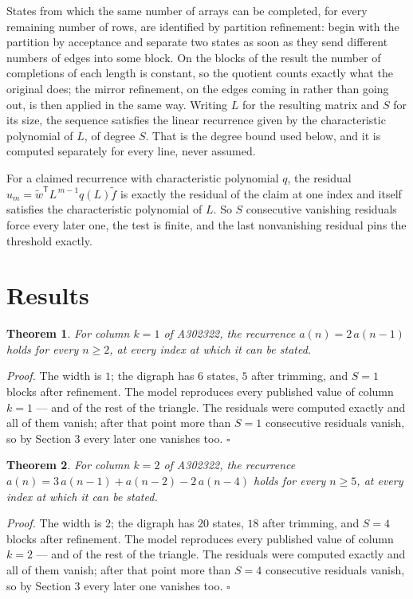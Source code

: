 \documentclass[11pt]{article}
\newtheorem{theorem}{Theorem}
\theoremstyle{definition}
\begin{document}
States from which the same number of arrays can be completed, for every remaining number of rows, are identified by partition refinement: begin with the partition by acceptance and separate two states as soon as they send different numbers of edges into some block. On the blocks of the result the number of completions of each length is constant, so the quotient counts exactly what the original does; the mirror refinement, on the edges coming in rather than going out, is then applied in the same way. Writing $L$ for the resulting matrix and $S$ for its size, the sequence satisfies the linear recurrence given by the characteristic polynomial of $L$, of degree $S$. That is the degree bound used below, and it is computed separately for every line, never assumed.

For a claimed recurrence with characteristic polynomial $q$, the residual $u_m = \tilde w^{\mathsf T}L^{\,m-1}q(L)\tilde f$ is exactly the residual of the claim at one index and itself satisfies the characteristic polynomial of $L$. So $S$ consecutive vanishing residuals force every later one, the test is finite, and the last nonvanishing residual pins the threshold exactly.

\section{Results}

\begin{theorem} For column $k = 1$ of A302322, the recurrence $a(n) = 2\,a(n-1)$ holds for every $n \ge 2$, at every index at which it can be stated.\end{theorem}

{\itshape Proof.} The width is $1$; the digraph has $6$ states, $5$ after trimming, and $S = 1$ blocks after refinement. The model reproduces every published value of column $k = 1$ --- and of the rest of the triangle. The residuals were computed exactly and all of them vanish; after that point more than $S = 1$ consecutive residuals vanish, so by Section 3 every later one vanishes too. $\square$

\begin{theorem} For column $k = 2$ of A302322, the recurrence $a(n) = 3\,a(n-1) + a(n-2) - 2\,a(n-4)$ holds for every $n \ge 5$, at every index at which it can be stated.\end{theorem}

{\itshape Proof.} The width is $2$; the digraph has $20$ states, $18$ after trimming, and $S = 4$ blocks after refinement. The model reproduces every published value of column $k = 2$ --- and of the rest of the triangle. The residuals were computed exactly and all of them vanish; after that point more than $S = 4$ consecutive residuals vanish, so by Section 3 every later one vanishes too. $\square$
\end{document}
